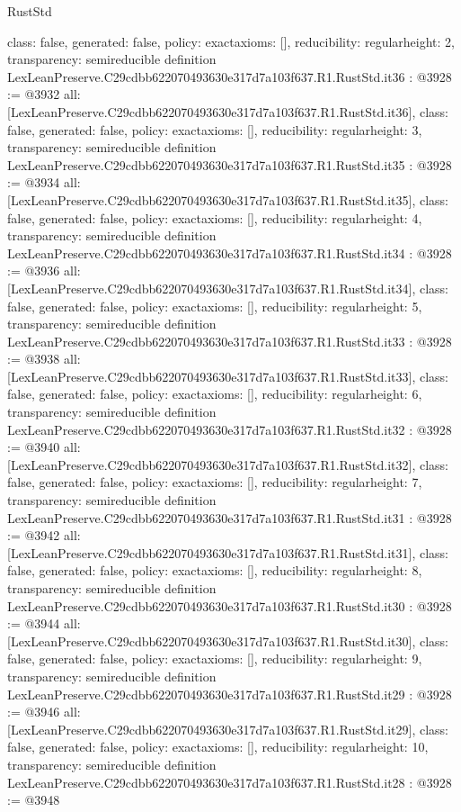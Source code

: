 \begin{lexlean}{RustStd}
\begin{coremodule}
{  class: false,
  generated: false,
  policy: exact{axioms: []},
  reducibility: regular{height: 2},
  transparency: semireducible
}
definition LexLeanPreserve.C29cdbb622070493630e317d7a103f637.R1.RustStd.it36 : @3928 := @3932 {
  all: [LexLeanPreserve.C29cdbb622070493630e317d7a103f637.R1.RustStd.it36],
  class: false,
  generated: false,
  policy: exact{axioms: []},
  reducibility: regular{height: 3},
  transparency: semireducible
}
definition LexLeanPreserve.C29cdbb622070493630e317d7a103f637.R1.RustStd.it35 : @3928 := @3934 {
  all: [LexLeanPreserve.C29cdbb622070493630e317d7a103f637.R1.RustStd.it35],
  class: false,
  generated: false,
  policy: exact{axioms: []},
  reducibility: regular{height: 4},
  transparency: semireducible
}
definition LexLeanPreserve.C29cdbb622070493630e317d7a103f637.R1.RustStd.it34 : @3928 := @3936 {
  all: [LexLeanPreserve.C29cdbb622070493630e317d7a103f637.R1.RustStd.it34],
  class: false,
  generated: false,
  policy: exact{axioms: []},
  reducibility: regular{height: 5},
  transparency: semireducible
}
definition LexLeanPreserve.C29cdbb622070493630e317d7a103f637.R1.RustStd.it33 : @3928 := @3938 {
  all: [LexLeanPreserve.C29cdbb622070493630e317d7a103f637.R1.RustStd.it33],
  class: false,
  generated: false,
  policy: exact{axioms: []},
  reducibility: regular{height: 6},
  transparency: semireducible
}
definition LexLeanPreserve.C29cdbb622070493630e317d7a103f637.R1.RustStd.it32 : @3928 := @3940 {
  all: [LexLeanPreserve.C29cdbb622070493630e317d7a103f637.R1.RustStd.it32],
  class: false,
  generated: false,
  policy: exact{axioms: []},
  reducibility: regular{height: 7},
  transparency: semireducible
}
definition LexLeanPreserve.C29cdbb622070493630e317d7a103f637.R1.RustStd.it31 : @3928 := @3942 {
  all: [LexLeanPreserve.C29cdbb622070493630e317d7a103f637.R1.RustStd.it31],
  class: false,
  generated: false,
  policy: exact{axioms: []},
  reducibility: regular{height: 8},
  transparency: semireducible
}
definition LexLeanPreserve.C29cdbb622070493630e317d7a103f637.R1.RustStd.it30 : @3928 := @3944 {
  all: [LexLeanPreserve.C29cdbb622070493630e317d7a103f637.R1.RustStd.it30],
  class: false,
  generated: false,
  policy: exact{axioms: []},
  reducibility: regular{height: 9},
  transparency: semireducible
}
definition LexLeanPreserve.C29cdbb622070493630e317d7a103f637.R1.RustStd.it29 : @3928 := @3946 {
  all: [LexLeanPreserve.C29cdbb622070493630e317d7a103f637.R1.RustStd.it29],
  class: false,
  generated: false,
  policy: exact{axioms: []},
  reducibility: regular{height: 10},
  transparency: semireducible
}
definition LexLeanPreserve.C29cdbb622070493630e317d7a103f637.R1.RustStd.it28 : @3928 := @3948 {
}
\end{coremodule}
\end{lexlean}
